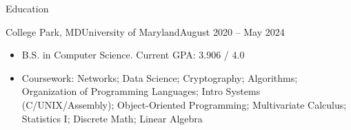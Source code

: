 \documentclass[]{mcdowellcv}
\begin{document}
	\makeheader
	
	\begin{cvsection}{Education}
		\begin{cvsubsection}{College Park, MD}{University of Maryland}{August 2020 -- May 2024}
			\begin{itemize}
				\item B.S. in Computer Science. Current GPA: 3.906 / 4.0
				\item Coursework: Networks; Data Science; Cryptography; Algorithms; Organization of Programming Languages; Intro
					  Systems (C/UNIX/Assembly); Object-Oriented Programming; Multivariate Calculus; Statistics I;
					  Discrete Math; Linear Algebra
			\end{itemize}
		\end{cvsubsection}
	\end{cvsection}
\end{document}
